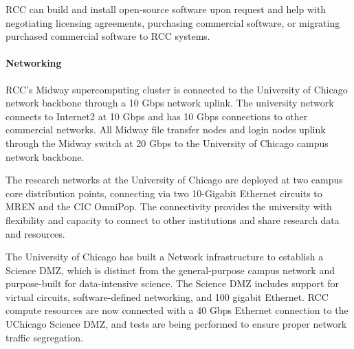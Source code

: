 RCC can build and install open-source software upon request and help with negotiating licensing agreements, purchasing commercial software, or migrating purchased commercial software to RCC systems.

\paragraph*{Networking}

RCC's Midway supercomputing cluster is connected to the University of Chicago network backbone through a 10 Gbps network uplink. The university network connects to Internet2 at 10 Gbps and has 10 Gbps connections to other commercial networks. All Midway file transfer nodes and login nodes uplink through the Midway switch at 20 Gbps to the University of Chicago campus network backbone.

The research networks at the University of Chicago are deployed at two campus core distribution points, connecting via two 10-Gigabit Ethernet circuits to MREN and the CIC OmniPop. The connectivity provides the university with flexibility and capacity to connect to other institutions and share research data and resources.

The University of Chicago has built a Network infrastructure to establish a Science DMZ, which is distinct from the general-purpose campus network and purpose-built for data-intensive science. The Science DMZ includes support for virtual circuits, software-defined networking, and 100 gigabit Ethernet. RCC compute resources are now connected with a 40 Gbps Ethernet connection to the UChicago Science DMZ, and tests are being performed to ensure proper network traffic segregation.















